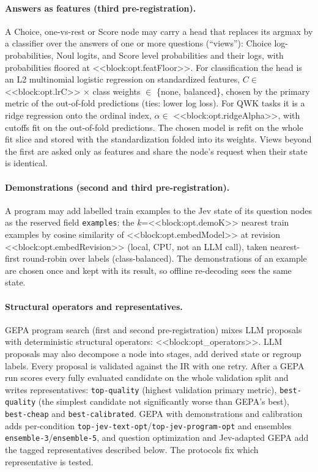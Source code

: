 \paragraph{Answers as features (third pre-registration).}
A Choice, one-vs-rest or Score node may carry a head that replaces its argmax by a classifier over the answers of one or more questions (``views''): Choice log-probabilities, Noul logits, and Score level probabilities and their logs, with probabilities floored at <<block:opt.featFloor>>. For classification the head is an L2 multinomial logistic regression on standardized features, $C \in$ <<block:opt.lrC>> $\times$ class weights $\in$ \{none, balanced\}, chosen by the primary metric of the out-of-fold predictions (ties: lower log loss). For QWK tasks it is a ridge regression onto the ordinal index, $\alpha \in$ <<block:opt.ridgeAlpha>>, with cutoffs fit on the out-of-fold predictions. The chosen model is refit on the whole fit slice and stored with the standardization folded into its weights. Views beyond the first are asked only as features and share the node's request when their state is identical.

\paragraph{Demonstrations (second and third pre-registration).}
A program may add labelled train examples to the Jev state of its question nodes as the reserved field \texttt{examples}: the $k$=<<block:opt.demoK>> nearest train examples by cosine similarity of <<block:opt.embedModel>> at revision <<block:opt.embedRevision>> (local, CPU, not an LLM call), taken nearest-first round-robin over labels (class-balanced). The demonstrations of an example are chosen once and kept with its result, so offline re-decoding sees the same state.

\paragraph{Structural operators and representatives.}
GEPA program search (first and second pre-registration) mixes LLM proposals with deterministic structural operators: <<block:opt_operators>>. LLM proposals may also decompose a node into stages, add derived state or regroup labels. Every proposal is validated against the IR with one retry. After a GEPA run \jevopt{} scores every fully evaluated candidate on the whole validation split and writes representatives: \texttt{top-quality} (highest validation primary metric), \texttt{best-quality} (the simplest candidate not significantly worse than GEPA's best), \texttt{best-cheap} and \texttt{best-calibrated}. GEPA with demonstrations and calibration adds per-condition \texttt{top-jev-text-opt}/\texttt{top-jev-program-opt} and ensembles \texttt{ensemble-3}/\texttt{ensemble-5}, and question optimization and Jev-adapted GEPA add the tagged representatives described below. The protocols fix which representative is tested.

